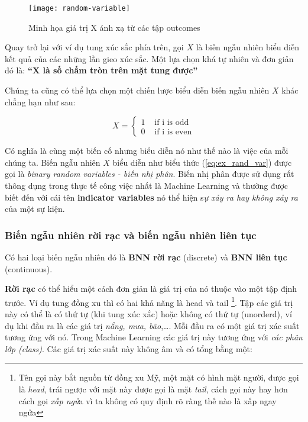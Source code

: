 \documentclass[../main-report.tex]{subfiles}
\begin{document}
\begin{figure}[ht!]
\centering\texttt{[image: random-variable]}
\caption{Minh họa giá trị X ánh xạ từ các tập outcomes}
\end{figure}

Quay trở lại với ví dụ tung xúc sắc phía trên, gọi $X$ là biến ngẫu nhiên biểu diễn kết quả của các những lần gieo xúc sắc. Một lựa chọn khá tự nhiên và đơn giản đó là: \textbf{``$\boldsymbol{X}$ là số chấm tròn trên mặt tung được''}

Chúng ta cũng có thể lựa chọn một chiến lược biểu diễn biến ngẫu nhiên $X$ khác chẳng hạn như sau:

\begin{equation} \label{eq:ex_rand_var}
X = \left\{\begin{array}{ll}
	1 & \text{ if i is odd} \\
	0 & \text{ if i is even}
	\end{array}\right.
\end{equation}

Có nghĩa là cùng một biến cố nhưng biểu diễn nó như thế nào là việc của mỗi chúng ta. Biến ngẫu nhiên $X$ biểu diễn như biểu thức (\ref{eq:ex_rand_var}) được gọi là \textit{binary random variables - biến nhị phân}. Biến nhị phân được sử dụng rất thông dụng trong thực tế công việc nhất là Machine Learning và thường được biết đến với cái tên \textbf{indicator variables} nó thể hiện s\textit{ự xảy ra hay không xảy ra} của một sự kiện.

\subsubsection*{Biến ngẫu nhiên rời rạc và biến ngẫu nhiên liên tục}
Có hai loại biến ngẫu nhiên đó là \textbf{BNN rời rạc} (discrete) và \textbf{BNN liên tục} (continuous).

\textbf{Rời rạc} có thể hiểu một cách đơn giản là giá trị của nó thuộc vào một tập định trước. 
Ví dụ tung đồng xu thì có hai khả năng là head và tail \footnote{Tên gọi này bắt nguồn từ đồng xu Mỹ, một mặt có hình mặt người, được gọi là \textit{head}, trái ngược với mặt này được gọi là mặt \textit{tail}, cách gọi này hay hơn cách gọi \textit{xấp ngử}a vì ta không có quy định rõ ràng thế nào là xấp ngay ngửa}. Tập các giá trị này có thể là có thứ tự (khi tung xúc xắc) hoặc không có thứ tự (unorderd), ví dụ khi đầu ra là các giá trị \textit{nắng, mưa, bão},\ldots. Mỗi đầu ra có một giá trị xác suất tương ứng với nó. Trong Machine Learning các giá trị này tương ứng với \textit{các phân lớp (class)}. Các giá trị xác suất này không âm và có tổng bằng một:
\end{document}
